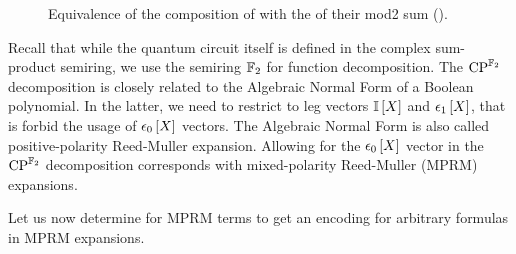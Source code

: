 \begin{figure}[t]
    \begin{center}
        
    \end{center}
    \caption{Equivalence of the composition of \computationCircuits{} with the \computationCircuit{} of their mod2 sum ().}
    \label{fig:mod2ComputationCircuit}
\end{figure}


Recall that while the quantum circuit itself is defined in the complex sum-product semiring, we use the semiring $\mathbb{F}_2$ for function decomposition.
The $\mathrm{CP}^{\mathbb{F}_2}$ decomposition is closely related to the Algebraic Normal Form of a Boolean polynomial.
In the latter, we need to restrict to leg vectors $\mathbb{I}\left[X\right]$ and $\epsilon_{1}\left[X\right]$, that is forbid the usage of $\epsilon_{0}\left[X\right]$ vectors.
The Algebraic Normal Form is also called positive-polarity Reed-Muller expansion.
Allowing for the $\epsilon_{0}\left[X\right]$ vector in the $\mathrm{CP}^{\mathbb{F}_2}$ decomposition corresponds with mixed-polarity Reed-Muller (MPRM) expansions.


Let us now determine \computationCircuits{} for MPRM terms to get an encoding for arbitrary formulas in MPRM expansions.

